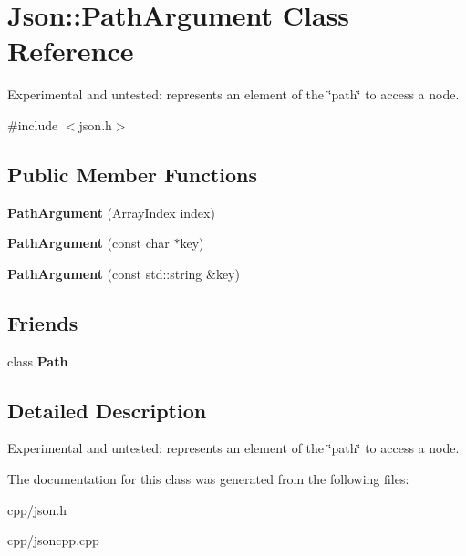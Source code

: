 \hypertarget{class_json_1_1_path_argument}{}\section{Json\+:\+:Path\+Argument Class Reference}
\label{class_json_1_1_path_argument}


Experimental and untested\+: represents an element of the \char`\"{}path\char`\"{} to access a node.  




{\ttfamily \#include $<$json.\+h$>$}

\subsection*{Public Member Functions}
\begin{DoxyCompactItemize}
\item 
\mbox{\label{class_json_1_1_path_argument_a53c5b27143b161301b95fd544c139ecf}} 
{\bfseries Path\+Argument} (Array\+Index index)
\item 
\mbox{\label{class_json_1_1_path_argument_a9690417a8a40e6e49f2acdf6c9281345}} 
{\bfseries Path\+Argument} (const char $\ast$key)
\item 
\mbox{\label{class_json_1_1_path_argument_a08f872cfee4fc600f7fa3bcaaff0d41c}} 
{\bfseries Path\+Argument} (const std\+::string \&key)
\end{DoxyCompactItemize}
\subsection*{Friends}
\begin{DoxyCompactItemize}
\item 
\mbox{\label{class_json_1_1_path_argument_a4877239a6b7f09fbf5a61ca68a49d74c}} 
class {\bfseries Path}
\end{DoxyCompactItemize}


\subsection{Detailed Description}
Experimental and untested\+: represents an element of the \char`\"{}path\char`\"{} to access a node. 

The documentation for this class was generated from the following files\+:\begin{DoxyCompactItemize}
\item 
cpp/json.\+h\item 
cpp/jsoncpp.\+cpp\end{DoxyCompactItemize}
